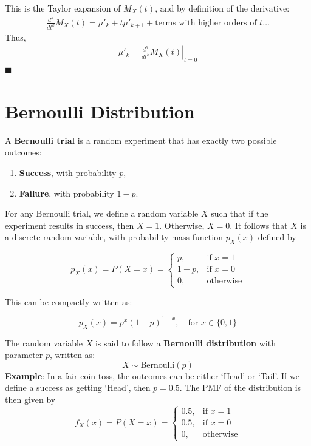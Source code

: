 \documentclass[twoside]{book}
\begin{document}
This is the Taylor expansion of \( M_X(t) \), and by definition of the derivative:
\begin{align*}
    \frac{d^k}{dt^k} M_X(t) = \mu'_k + t\mu'_{k+1} + \text{terms with higher orders of }t \dots
\end{align*}
Thus,
\begin{align*}
    \mu'_k = \left. \frac{d^k}{dt^k} M_X(t) \right|_{t=0}
\end{align*}
\hfill\(\blacksquare\)

\section{Bernoulli Distribution}

A \textbf{Bernoulli trial} is a random experiment that has exactly two possible outcomes:
\begin{enumerate}
    \item \textbf{Success}, with probability $p$,
    \item \textbf{Failure}, with probability $1 - p$.
\end{enumerate}

For any Bernoulli trial, we define a random variable $X$ such that if the experiment results in success, then $X = 1$. Otherwise, $X = 0$. It follows that $X$ is a discrete random
variable, with probability mass function $p_X(x)$ defined by

\begin{textbox}
    \[
p_X(x) = P(X = x) = 
\begin{cases}
p, & \text{if } x = 1 \\
1 - p, & \text{if } x = 0 \\
0, & \text{otherwise}
\end{cases}
\]
\end{textbox}

This can be compactly written as:
\begin{textbox}
    \[
p_X(x) = p^x (1 - p)^{1 - x}, \quad \text{for } x \in \{0, 1\}
\]
\end{textbox}

The random variable $X$ is said to follow a \textbf{Bernoulli distribution} with parameter $p$, written as:
\[
X \sim \text{Bernoulli}(p)
\]
\textbf{Example}: In a fair coin toss, the outcomes can be either `Head' or `Tail'. If we define a success as getting `Head', then $p = 0.5$. The PMF of the distribution is then given by
\[
f_X(x) = P(X = x) = 
\begin{cases}
0.5, & \text{if } x = 1 \\
0.5, & \text{if } x = 0 \\
0, & \text{otherwise}
\end{cases}
\]
\end{document}
